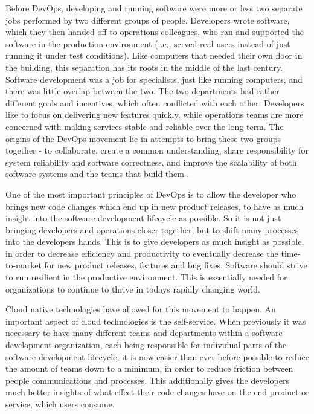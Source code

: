 Before DevOps, developing and running software were more or less two separate jobs performed by two different groups of people.
Developers wrote software, which they then handed off to operations colleagues, who ran and supported the software in the production environment
(i.e., served real users instead of just running it under test conditions).
Like computers that needed their own floor in the building, this separation has its roots in the middle of the last century.
Software development was a job for specialists, just like running computers, and there was little overlap between the two.
The two departments had rather different goals and incentives, which often conflicted with each other. Developers like to focus on delivering new features quickly, while operations teams are more concerned with making services stable and reliable over the long term.
The origins of the DevOps movement lie in attempts to bring these two groups together - to collaborate, create a common understanding, share responsibility for system reliability and software correctness, and improve the scalability of both software systems and the teams that build them
\autocite{cloudNativeDevopsMitKubernetesArundel2019cloud}.


One of the most important principles of DevOps is
to allow the developer who brings new code changes
which end up in new product releases,
to have as much insight into the software development lifecycle as possible.
So it is not just bringing developers and operations closer together,
but to shift many processes into the developers hands.
This is to give developers as much insight as possible,
in order to decrease efficiency and productivity to eventually
decrease the time-to-market for new product releases, features and bug fixes.
Software should strive to run resilient in the productive environment.
This is essentially needed for organizations to continue to thrive in todays
rapidly changing world.

Cloud native technologies have allowed for this movement to happen.
An important aspect of cloud technologies is the self-service.
When previously it was necessary to have many different teams and departments
within a software development organization,
each being responsible for individual parts of the 
software development lifecycle,
it is now easier than ever before possible to reduce the amount of
teams down to a minimum, in order to reduce friction between people communications and processes.
This additionally gives the developers much better insights of what effect their code changes have
on the end product or service, which users consume.

